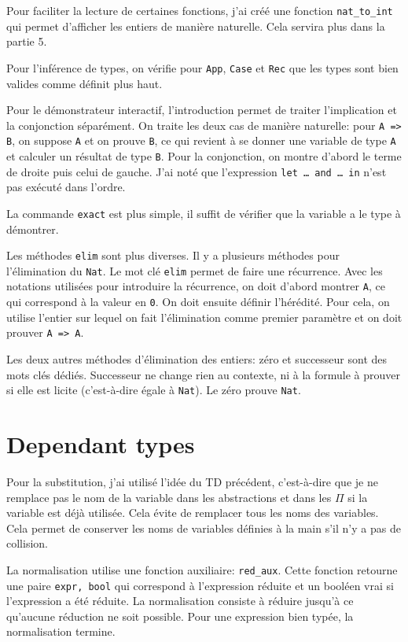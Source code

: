 \documentclass[a4paper]{article}
\begin{document}
    Pour faciliter la lecture de certaines fonctions, j'ai créé une fonction \verb|nat_to_int| qui permet d'afficher les entiers de manière naturelle. Cela servira plus dans la partie 5.

    Pour l'inférence de types, on vérifie pour \verb|App|, \verb|Case| et \verb|Rec| que les types sont bien valides comme définit plus haut. 

    Pour le démonstrateur interactif, l'introduction permet de traiter l'implication et la conjonction séparément. On traite les deux cas de manière naturelle: pour \verb|A => B|, on suppose \verb|A| et on prouve \verb|B|, ce qui revient à se donner une variable de type \verb|A| et calculer un résultat de type \verb|B|. Pour la conjonction, on montre d'abord le terme de droite puis celui de gauche. J'ai noté que l'expression \verb-let … and … in- n'est pas exécuté dans l'ordre. 

    La commande \verb|exact| est plus simple, il suffit de vérifier que la variable a le type à démontrer. 

    Les méthodes \verb|elim| sont plus diverses. Il y a plusieurs méthodes pour l'élimination du \verb|Nat|. Le mot clé \verb|elim| permet de faire une récurrence. Avec les notations utilisées pour introduire la récurrence, on doit d'abord montrer \verb|A|, ce qui correspond à la valeur en \verb|0|. On doit ensuite définir l'hérédité. Pour cela, on utilise l'entier sur lequel on fait l'élimination comme premier paramètre et on doit prouver \verb|A => A|. 

    Les deux autres méthodes d'élimination des entiers: zéro et successeur sont des mots clés dédiés. Successeur ne change rien au contexte, ni à la formule à prouver si elle est licite (c'est-à-dire égale à \verb|Nat|). Le zéro prouve \verb|Nat|.


    \section{Dependant types}

    Pour la substitution, j'ai utilisé l'idée du TD précédent, c'est-à-dire que je ne remplace pas le nom de la variable dans les abstractions et dans les $\Pi$ si la variable est déjà utilisée. Cela évite de remplacer tous les noms des variables. Cela permet de conserver les noms de variables définies à la main s'il n'y a pas de collision. 

    La normalisation utilise une fonction auxiliaire: \verb|red_aux|. Cette fonction retourne une paire \verb|expr, bool| qui correspond à l'expression réduite et un booléen vrai si l'expression a été réduite. La normalisation consiste à réduire jusqu'à ce qu'aucune réduction ne soit possible. Pour une expression bien typée, la normalisation termine.
\end{document}
